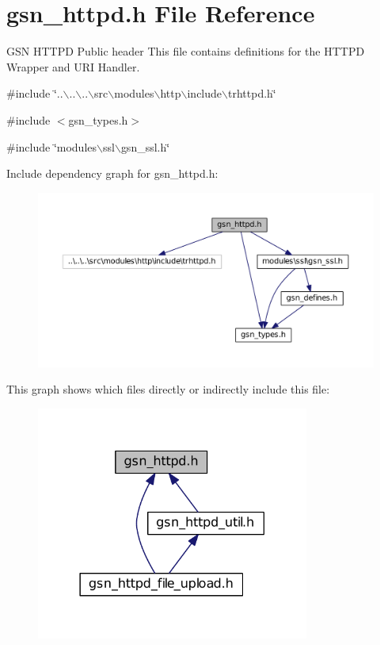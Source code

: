 \hypertarget{a00508}{
\section{gsn\_\-httpd.h File Reference}
\label{a00508}
}


GSN HTTPD Public header This file contains definitions for the HTTPD Wrapper and URI Handler.  


{\ttfamily \#include \char`\"{}..$\backslash$..$\backslash$..$\backslash$src$\backslash$modules$\backslash$http$\backslash$include$\backslash$trhttpd.h\char`\"{}}\par
{\ttfamily \#include $<$gsn\_\-types.h$>$}\par
{\ttfamily \#include \char`\"{}modules$\backslash$ssl$\backslash$gsn\_\-ssl.h\char`\"{}}\par
Include dependency graph for gsn\_\-httpd.h:
\nopagebreak
\begin{figure}[H]
\begin{center}
\leavevmode
\includegraphics[width=400pt]{a00739}
\end{center}
\end{figure}
This graph shows which files directly or indirectly include this file:
\nopagebreak
\begin{figure}[H]
\begin{center}
\leavevmode
\includegraphics[width=254pt]{a00740}
\end{center}
\end{figure}
